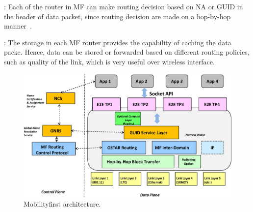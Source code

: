 \vspace{1mm}: Each of the router in MF can make routing decision based on NA or GUID in the header of data packet, since routing decision are made on a hop-by-hop manner~\cite{nelson2011gstar}.

\vspace{1mm}: The storage in each MF router provides the capability of caching the data packe. Hence, data can be stored or forwarded based on different routing policies, such as quality of the link, which is very useful over wireless interface.
\begin{figure}
\centering
\includegraphics[width=\columnwidth]{figure/mf_arch.eps}
\caption{\label{fig:mf_arch}Mobilityfirst architecture.}
\end{figure}

